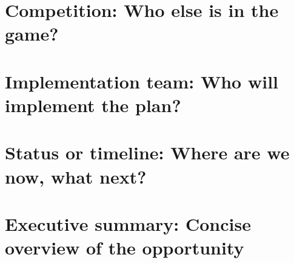 \documentclass[a4paper, 11pt]{report}
\begin{document}
	{
		\FloatBarrier
		\chapter{Competition: Who else is in the game?}
		\label{chp:competition}
		
	}

	{
		\FloatBarrier
		\chapter{Implementation team: Who will implement the plan?}
		\label{chp:implementation}
		
	}

	{
		\FloatBarrier
		\chapter{Status or timeline: Where are we now, what next?}
		\label{chp:timeline}
		
	}

	{
		\FloatBarrier
		\chapter{Executive summary: Concise overview of the opportunity}
		\label{chp:summary}
		
	}

	{
		\FloatBarrier
		\newpage
		\printbibliography[title = References]
	}
\end{document}
